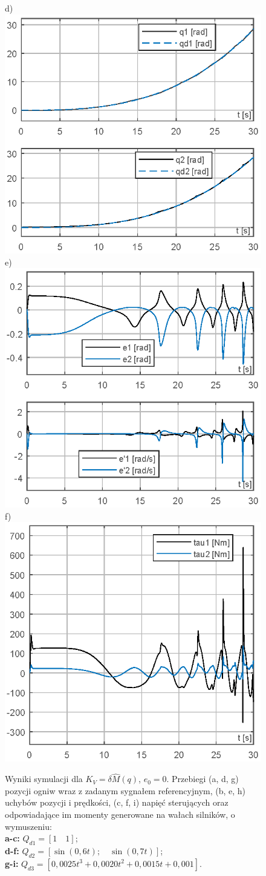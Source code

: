 \documentclass[10pt, a4paper, polish]{article}
\begin{document}
\begin{figure}[H]
		d) \includegraphics[width=0.30\columnwidth]{SRManCw5/SRManCw5_ZADANIE2/figs/06Pozycje} e)\includegraphics[width=0.30\columnwidth]{SRManCw5/SRManCw5_ZADANIE2/figs/06Uchyby} f)\includegraphics[width=0.30\columnwidth]{SRManCw5/SRManCw5_ZADANIE2/figs/06Sygnal}\caption{
		Wyniki symulacji dla $K_V=\delta\hat{M}(q)$, $e_0=0$. Przebiegi (a, d, g) pozycji ogniw wraz z zadanym sygnałem referencyjnym, (b, e, h) uchybów pozycji i prędkości, (c, f, i)  napięć sterujących oraz odpowiadające im momenty generowane na wałach silników, o wymuszeniu:\\
		\textbf{a-c:} $Q_{d1}=[1\quad1]$;\\
		\textbf{d-f:} $Q_{d2}=[\sin(0,6t);\quad \sin(0,7t)]$;\\
		\textbf{g-i:} $Q_{d3}=[0,0025t^3+0,0020t^2+0,0015t+0,001]$.}
\end{figure}
\end{document}
